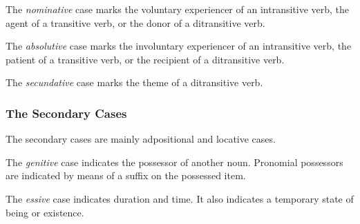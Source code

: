 \documentclass[grammar]{subfiles}
\begin{document}

  The \emph{nominative} case marks the voluntary experiencer of an intransitive verb, the agent of a transitive verb, or the donor of a ditransitive verb.


  The \emph{absolutive} case marks the involuntary experiencer of an intransitive verb, the patient of a transitive verb, or the recipient of a ditransitive verb.


  The \emph{secundative} case marks the theme of a ditransitive verb.

  \subsubsection{The Secondary Cases}
  \label{sssec:nm_secondary_cases}

  The secondary cases are mainly adpositional and locative cases.


  The \emph{genitive} case indicates the possessor of another noun.  Pronomial possessors are indicated by means of a suffix on the possessed item.


  The \emph{essive} case indicates duration and time.  It also indicates a temporary state of being or existence.

\end{document}
